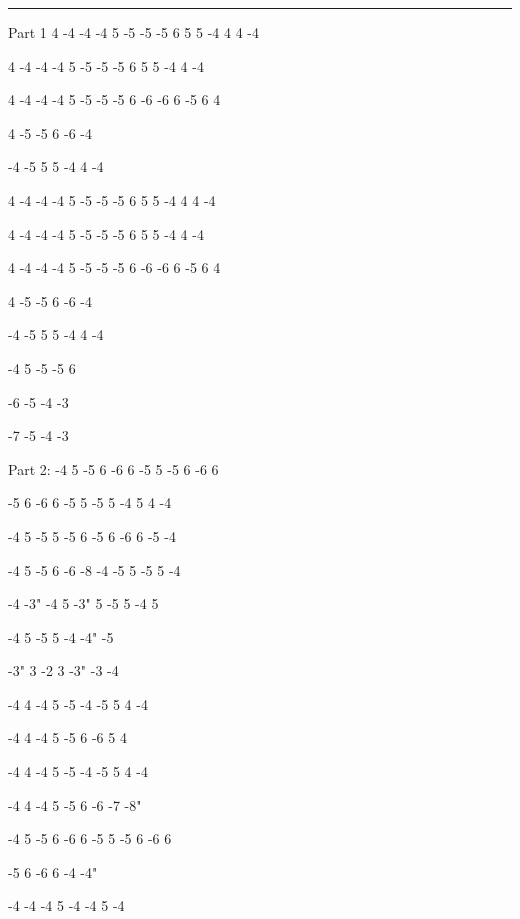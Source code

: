 \documentclass[a4paper,12pt]{article}
\begin{document}
\noindent\rule{\columnwidth}{1pt}
\begin{multicols}{2}
\begin{lstsong}
Part 1
4 -4 -4 -4 5 -5 -5 -5 6 5 5 -4 4 4 -4

4 -4 -4 -4 5 -5 -5 -5 6 5 5 -4 4 -4

4 -4 -4 -4 5 -5 -5 -5 6 -6 -6 6 -5 6 4

4 -5 -5 6 -6 -4

-4 -5 5 5 -4 4 -4

4 -4 -4 -4 5 -5 -5 -5 6 5 5 -4 4 4 -4

4 -4 -4 -4 5 -5 -5 -5 6 5 5 -4 4 -4

4 -4 -4 -4 5 -5 -5 -5 6 -6 -6 6 -5 6 4

4 -5 -5 6 -6 -4

-4 -5 5 5 -4 4 -4

-4 5 -5 -5 6

-6 -5 -4 -3

-7 -5 -4 -3
\end{lstsong}\vfill\columnbreak\begin{lstsong}
Part 2:
-4 5 -5 6 -6 6 -5 5 -5 6 -6 6

-5 6 -6 6 -5 5 -5 5 -4 5 4 -4

-4 5 -5 5 -5 6 -5 6 -6 6 -5 -4

-4 5 -5 6 -6 -8 -4 -5 5 -5 5 -4

-4 -3" -4 5 -3" 5 -5 5 -4 5

-4 5 -5 5 -4 -4" -5

-3" 3 -2 3 -3" -3 -4

-4 4 -4 5 -5 -4 -5 5 4 -4

-4 4 -4 5 -5 6 -6 5 4

-4 4 -4 5 -5 -4 -5 5 4 -4

-4 4 -4 5 -5 6 -6 -7 -8"

-4 5 -5 6 -6 6 -5 5 -5 6 -6 6

-5 6 -6 6 -4 -4"

-4 -4 -4 5 -4 -4 5 -4
\end{lstsong}
\end{multicols}
\newpage




\end{document}
